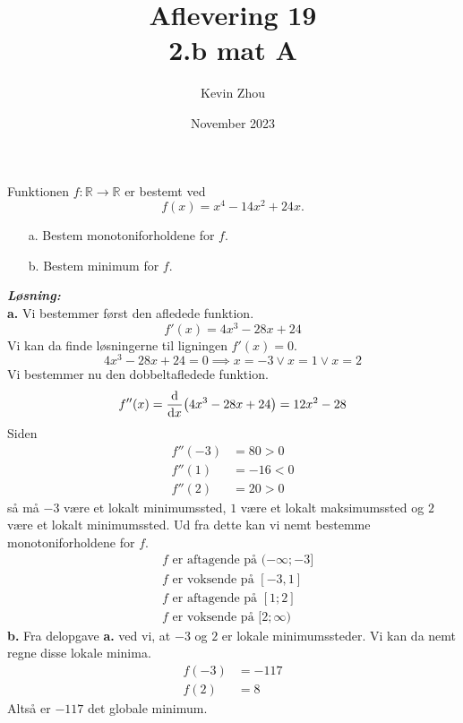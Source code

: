 \documentclass{report}
\title{Aflevering 19\\
{\Large \textbf{2.b mat A}}}
\author{Kevin Zhou}
\date{November 2023}
\newcommand{\sol}{\setlength{\parindent}{0cm}\textbf{\textit{Løsning:}}\setlength{\parindent}{1cm}}
\begin{document}
\maketitle
\begin{question}{}{}
Funktionen $f:\mathbb{R} \to \mathbb{R}$ er bestemt ved
\[
  f(x)=x^4-14x^2+24x.
\] 
\begin{itemize}
  \item[a.] Bestem monotoniforholdene for $f$.
  \item[b.] Bestem minimum for $f$.
\end{itemize}
\end{question}
\sol \\ 
\textbf{a.} Vi bestemmer først den afledede funktion.
\[
f'(x)=4x^3-28x+24
\] 
Vi kan da finde løsningerne til ligningen $f'(x)=0$.
\[
4x^3-28x+24=0 \implies x=-3 \lor x=1 \lor x=2
\] 
Vi bestemmer nu den dobbeltafledede funktion.
\[
f''(x)=\dv{x} (4x^3-28x+24) = 12x^2 - 28
\] 
Siden 
\begin{equation*}
\begin{split}
f''(-3)&=80>0\\ 
  f''(1)&=-16<0\\ 
  f''(2)&=20>0
\end{split}
\end{equation*}
så må $-3$ være et lokalt minimumssted, $1$ være et lokalt maksimumssted og $2$ være et lokalt minimumssted.
Ud fra dette kan vi nemt bestemme monotoniforholdene for $f$. 
\begin{equation*}
\begin{split}
  &f \text{ er aftagende på } (-\infty ;-3]\\
  &f \text{ er voksende på } [-3,1]\\ 
  &f \text{ er aftagende på } [1;2]\\
  &f \text{ er voksende på } [2;\infty)
\end{split}
\end{equation*}
\textbf{b.}
Fra delopgave \textbf{a.} ved vi, at $-3$ og $2$ er lokale minimumssteder.
Vi kan da nemt regne disse lokale minima.
\begin{equation*}
\begin{split}
  f(-3)&= -117\\ 
  f(2)&= 8
\end{split}
\end{equation*}
Altså er $-117$ det globale minimum.
\end{document}
